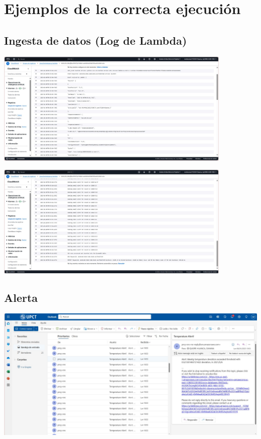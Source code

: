 \section{Ejemplos de la correcta ejecución}

\subsection{Ingesta de datos (Log de Lambda)}

\begin{center}
     \includegraphics[width=0.85\textwidth]{img/ingesta1.jpeg}

     \includegraphics[width=0.85\textwidth]{img/ingesta2.jpeg}
\end{center}

\subsection{Alerta}

\begin{center}
     \includegraphics[width=\textwidth]{img/alerta.jpeg}
\end{center}

